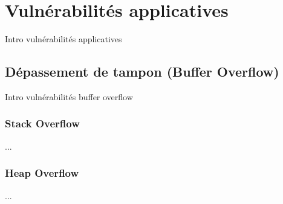

\chapter{Vulnérabilités applicatives}\label{vulnerabilites:applicatives}

Intro vulnérabilités applicatives

\section{Dépassement de tampon (Buffer Overflow)}\label{vulnerabilites:applicatives:buffer-overflow}

Intro vulnérabilités buffer overflow

\subsection{Stack Overflow}\label{vulnerabilites:applicatives:buffer-overflow:stack}

...

\subsection{Heap Overflow}\label{vulnerabilites:applicatives:buffer-overflow:heap}

...

\endinput
